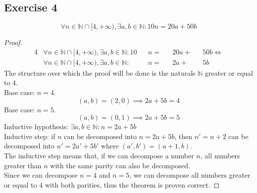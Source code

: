 \subsection{Exercise 4}
\begin{theorem}
	\begin{equation*}
		\forall n \in \mathbb{N}\cap[4,+\infty),\exists a,b\in\mathbb{N}\colon 10n=20a+50b
	\end{equation*}
\end{theorem}
\begin{proof}
	\begin{alignat*}{4}
		&\forall n \in \mathbb{N}\cap[4,+\infty),\exists a,b\in\mathbb{N}\colon 10&&n=&&20a+&&50b \iff \\
		&\forall n \in \mathbb{N}\cap[4,+\infty),\exists a,b\in\mathbb{N}\colon   &&n=&&2a +&&5b
	\end{alignat*}
	The structure over which the proof will be done is the naturals $\mathbb{N}$ greater or equal to $4$.\\
	Base case: $n=4$.
	\begin{equation*}
		(a,b)=(2,0) \implies 2a+5b=4
	\end{equation*}
	Base case: $n=5$.
	\begin{equation*}
		(a,b)=(0,1) \implies 2a+5b=5
	\end{equation*}
	Inductive hypothesis: $\exists a,b\in\mathbb{N}\colon n=2a+5b$\\
	Inductive step: if $n$ can be decomposed into $n=2a+5b$, then $n'=n+2$ can be decomposed into $n'=2a'+5b'$ where $(a',b')=(a+1,b)$.\\
	The inductive step means that, if we can decompose a number $n$, all numbers greater than $n$ with the same parity can also be decomposed.\\
	Since we can decompose $n=4$ and $n=5$, we can decompose all numbers greater or equal to $4$ with both parities, thus the theorem is proven correct.
\end{proof}
